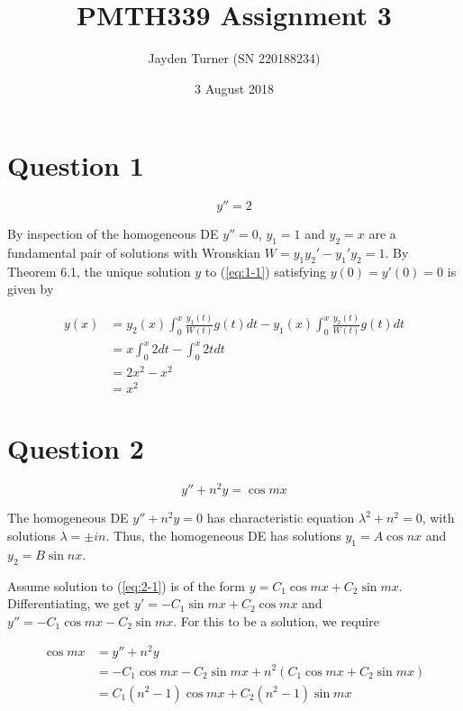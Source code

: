 \documentclass{article}
\title{PMTH339 Assignment 3}
\date{3 August 2018}
\author{Jayden Turner (SN 220188234)}
\begin{document}
\maketitle
{}

\section*{Question 1}

\begin{equation} \label{eq:1-1}
    y'' = 2
\end{equation}

\hfill \break
By inspection of the homogeneous DE $y'' = 0$, $y_1 = 1$ and $y_2 = x$ are a fundamental pair of solutions with Wronskian
$W = y_1y_2' - y_1'y_2 = 1$. By Theorem 6.1, the unique solution $y$ to (\ref{eq:1-1}) satisfying $y(0) = y'(0) = 0$ is given by

\begin{align*}
    y(x) &= y_2(x)\int_0^x \frac{y_1(t)}{W(t)}g(t) dt - y_1(x)\int_0^x \frac{y_2(t)}{W(t)}g(t) dt\\
    &= x\int_0^x 2 dt - \int_0^x 2t dt\\
    &= 2x^2 - x^2\\
    &= x^2
\end{align*}

\section*{Question 2}

\begin{equation} \label{eq:2-1}
    y'' + n^2y = \cos mx
\end{equation}

\hfill \break
The homogeneous DE $y'' + n^2y = 0$ has characteristic equation $\lambda^2 + n^2 = 0$, with solutions $\lambda = \pm in$. Thus, the homogeneous DE has solutions
$y_1 = A\cos nx$ and $y_2 = B\sin nx$.

\hfill \break
Assume solution to (\ref{eq:2-1}) is of the form $y = C_1\cos mx + C_2\sin mx$. Differentiating, we get $y' = -C_1\sin mx + C_2\cos mx$ and
$y'' = -C_1\cos mx - C_2\sin mx$. For this to be a solution, we require

\begin{align*}
    \cos mx &= y'' + n^2y\\
    &= -C_1\cos mx - C_2\sin mx + n^2(C_1\cos mx + C_2\sin mx)\\
    &= C_1(n^2 - 1)\cos mx + C_2(n^2 - 1)\sin mx
\end{align*}
\end{document}
